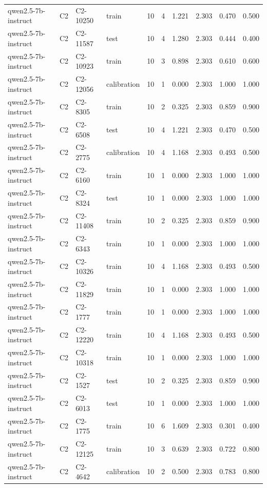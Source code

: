 \begin{table}
\begin{tabular}{llllrrrrrr}
qwen2.5-7b-instruct & C2 & C2-10250 & train & 10 & 4 & 1.221 & 2.303 & 0.470 & 0.500 \\
qwen2.5-7b-instruct & C2 & C2-11587 & test & 10 & 4 & 1.280 & 2.303 & 0.444 & 0.400 \\
qwen2.5-7b-instruct & C2 & C2-10923 & train & 10 & 3 & 0.898 & 2.303 & 0.610 & 0.600 \\
qwen2.5-7b-instruct & C2 & C2-12056 & calibration & 10 & 1 & 0.000 & 2.303 & 1.000 & 1.000 \\
qwen2.5-7b-instruct & C2 & C2-8305 & train & 10 & 2 & 0.325 & 2.303 & 0.859 & 0.900 \\
qwen2.5-7b-instruct & C2 & C2-6508 & test & 10 & 4 & 1.221 & 2.303 & 0.470 & 0.500 \\
qwen2.5-7b-instruct & C2 & C2-2775 & calibration & 10 & 4 & 1.168 & 2.303 & 0.493 & 0.500 \\
qwen2.5-7b-instruct & C2 & C2-6160 & train & 10 & 1 & 0.000 & 2.303 & 1.000 & 1.000 \\
qwen2.5-7b-instruct & C2 & C2-8324 & test & 10 & 1 & 0.000 & 2.303 & 1.000 & 1.000 \\
qwen2.5-7b-instruct & C2 & C2-11408 & train & 10 & 2 & 0.325 & 2.303 & 0.859 & 0.900 \\
qwen2.5-7b-instruct & C2 & C2-6343 & train & 10 & 1 & 0.000 & 2.303 & 1.000 & 1.000 \\
qwen2.5-7b-instruct & C2 & C2-10326 & train & 10 & 4 & 1.168 & 2.303 & 0.493 & 0.500 \\
qwen2.5-7b-instruct & C2 & C2-11829 & train & 10 & 1 & 0.000 & 2.303 & 1.000 & 1.000 \\
qwen2.5-7b-instruct & C2 & C2-1777 & train & 10 & 1 & 0.000 & 2.303 & 1.000 & 1.000 \\
qwen2.5-7b-instruct & C2 & C2-12220 & train & 10 & 4 & 1.168 & 2.303 & 0.493 & 0.500 \\
qwen2.5-7b-instruct & C2 & C2-10318 & train & 10 & 1 & 0.000 & 2.303 & 1.000 & 1.000 \\
qwen2.5-7b-instruct & C2 & C2-1527 & test & 10 & 2 & 0.325 & 2.303 & 0.859 & 0.900 \\
qwen2.5-7b-instruct & C2 & C2-6013 & test & 10 & 1 & 0.000 & 2.303 & 1.000 & 1.000 \\
qwen2.5-7b-instruct & C2 & C2-1775 & train & 10 & 6 & 1.609 & 2.303 & 0.301 & 0.400 \\
qwen2.5-7b-instruct & C2 & C2-12125 & train & 10 & 3 & 0.639 & 2.303 & 0.722 & 0.800 \\
qwen2.5-7b-instruct & C2 & C2-4642 & calibration & 10 & 2 & 0.500 & 2.303 & 0.783 & 0.800 \\

\end{tabular}
\end{table}
